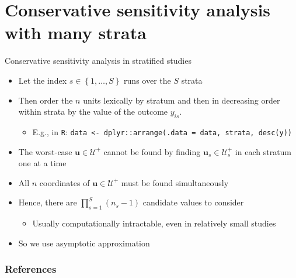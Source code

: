 \documentclass[table, xcolor={dvipsnames}, 9pt]{beamer}
\theoremstyle{newstyle}
\begin{document}
\section{Conservative sensitivity analysis with many strata}
\begin{frame}{Conservative sensitivity analysis in stratified studies}
\vfill
\begin{itemize} \vfill
\item Let the index $s \in \left\{1, \ldots, S\right\}$ runs over the $S$ strata \vfill
\item \pause Then order the $n$ units lexically by stratum and then in decreasing order within strata by the value of the outcome $y_{is}$.
\begin{itemize} \vfill
\item \pause E.g., in \texttt{R}: \texttt{data <- dplyr::arrange(.data = data, strata, desc(y))} \vfill
\end{itemize}	 \vfill
\item \pause The worst-case $\mathbf{u} \in \mathcal{U}^+$ cannot be found by finding $\mathbf{u}_s \in \mathcal{U}_s^+$ in each stratum one at a time \vfill
\item \pause All $n$ coordinates of $\mathbf{u} \in \mathcal{U}^+$ must be found simultaneously \vfill
\item \pause Hence, there are $\prod \limits_{s = 1}^S \left(n_s - 1\right)$ candidate values to consider \vfill
\begin{itemize}
\item \pause Usually computationally intractable, even in relatively small studies \pause \vfill
\end{itemize} \vfill
\item So we use asymptotic approximation \citep{gastwirthetal2000} \vfill
\end{itemize} \vfill
\end{frame}
\begin{frame}[allowframebreaks]
\frametitle{References} 
\scriptsize

\end{frame}
\end{document}

